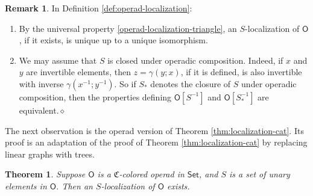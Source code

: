 \documentclass{amsbook}
\numberwithin{section}{chapter}
\numberwithin{subsection}{section}
\numberwithin{equation}{section}
\theoremstyle{plain}
\newtheorem{theorem}[equation]{Theorem}
\theoremstyle{definition}
\newtheorem{remark}[equation]{Remark}
\newcommand{\colorc}{\mathfrak{C}}
\renewcommand{\O}{\mathsf{O}}
\newcommand{\dqed}{\hfill$\diamond$}
\newcommand{\inv}[1]{{#1}^{-1}}
\newcommand{\Sinv}{\inv{S}}
\newcommand{\xinv}{\inv{x}}
\newcommand{\yinv}{\inv{y}}
\newcommand{\Osinv}{\O[\Sinv]}
\newcommand{\Set}{\mathsf{Set}}
\begin{document}
\begin{remark} In Definition \ref{def:operad-localization}:
\begin{enumerate}\item By the universal property \eqref{operad-localization-triangle}, an $S$-localization of $\O$, if it exists, is unique up to a unique isomorphism.  
\item We may assume that $S$ is closed under operadic composition.  Indeed, if $x$ and $y$ are invertible elements, then $z=\gamma(y;x)$, if it is defined, is also invertible with inverse $\gamma(\xinv;\yinv)$.  So if $S_*$ denotes the closure of $S$ under operadic composition, then the properties defining $\Osinv$ and $\O[\Sinv_*]$ are equivalent.\dqed
\end{enumerate}\end{remark}

The next observation is the operad version of Theorem \ref{thm:localization-cat}.  Its proof  is an adaptation of the proof of Theorem \ref{thm:localization-cat} by replacing linear graphs with trees.

\begin{theorem}\label{thm:operad-localization-exists}
Suppose $\O$ is a $\colorc$-colored operad in $\Set$, and $S$ is a set of unary elements in $\O$.  Then an $S$-localization of $\O$ exists.
\end{theorem}
\end{document}
